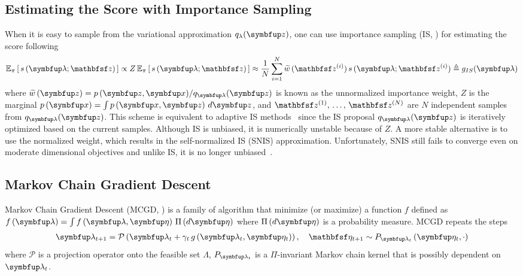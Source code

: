 \subsection{Estimating the Score with Importance Sampling}\label{section:is}
When it is easy to sample from the variational approximation \(q_{\lambda}(\vz)\), one can use importance sampling (IS, \citealt{robert_monte_2004}) for estimating the score following
\begin{align*}
  \Esub{\pi}{ s\,(\vlambda;\rvvz) } 
  \propto Z\,\Esub{\pi}{ s\,(\vlambda; \rvvz) } %
  \approx \frac{1}{N} \sum^{N}_{i=1} \widetilde{w}\,(\rvvz^{(i)}) \, s\,(\vlambda; \rvvz^{(i)}) 
  \triangleq g_{IS}(\vlambda)
\end{align*}
where \(\widetilde{w}\,(\vz) = p\,(\vz,\vx) / q_{\vlambda}(\vz)\) is known as the unnormalized importance weight, \(Z\) is the marginal \(p\left(\vx\right) = \int p\left(\vx, \vz\right) \, d\vz\), and \(\rvvz^{(1)},\, \ldots,\, \rvvz^{(N)}\) are \(N\) independent samples from \(q_{\vlambda}(\vz)\).
This scheme is equivalent to adaptive IS methods~\citep{bugallo_adaptive_2017} since the IS proposal \(q_{\vlambda}(\vz)\) is iteratively optimized based on the current samples.
Although IS is unbiased, it is numerically unstable because of \(Z\). %
A more stable alternative is to use the normalized weight, which results in the self-normalized IS (SNIS) approximation.
Unfortunately, SNIS still fails to converge even on moderate dimensional objectives and unlike IS, it is no longer unbiased~\citep{robert_monte_2004}.

\subsection{Markov Chain Gradient Descent}\label{section:mcgd}
Markov Chain Gradient Descent (MCGD, \citealt{duchi_ergodic_2012, NEURIPS2018_1371bcce}) is a family of algorithm that minimize (or maximize) a function \(f\) defined as \(f\left(\vlambda\right) = \int f\left(\vlambda, \veta\right) \, \Pi\left(d\veta\right)\) where \(\Pi\left(d\veta\right)\) is a probability measure.
MCGD repeats the steps 
\begin{align*}
  \vlambda_{t+1}    = \mathcal{P}\left( \vlambda_{t} + \gamma_t \, g\left(\vlambda_t, \veta_{t}\right)\right),\quad 
  \rvveta_{t+1}  \sim P_{\vlambda_{t}}\left( \veta_{t}, \cdot \right)
\end{align*}
where \(\mathcal{P}\) is a projection operator onto the feasible set \(\Lambda\), \(P_{\vlambda_{t}}\) is a \(\Pi\)-invariant Markov chain kernel that is possibly dependent on \(\vlambda_t\).

